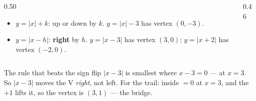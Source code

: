 \documentclass[aspectratio=169, 11pt]{beamer}
\newcommand{\lgrid}[4]{%
  \draw[step=1, linegray!40, very thin] (#1,#3) grid (#2,#4);
  \draw[->, thick, charcoal] (#1,0)--(#2,0) node[below right, font=\tiny]{$x$};
  \draw[->, thick, charcoal] (0,#3)--(0,#4) node[left, font=\tiny]{$y$};}
\begin{document}
\begin{frame}[t, plain]
  \begin{columns}[T]
    \begin{column}{0.50\textwidth}
      \begin{itemize}\setlength{\itemsep}{5pt}
        \item $y=|x|+k$: up or down by $k$. \; $y=|x|-3$ has vertex $(0,-3)$.
        \item $y=|x-h|$: \textbf{right} by $h$. \; $y=|x-3|$ has vertex $(3,0)$; \; $y=|x+2|$ has
              vertex $(-2,0)$.
      \end{itemize}
    \end{column}
    \begin{column}{0.46\textwidth}
      \centering
    \end{column}
  \end{columns}
  \vspace{4pt}
  \begin{block}{The rule that beats the sign flip}
    $|x-3|$ is smallest where $x-3=0$ --- at $x=3$. So $|x-3|$ moves the V \emph{right}, not left.
    For the trail: inside $=0$ at $x=3$, and the $+1$ lifts it, so the vertex is $(3,1)$ --- the bridge.
  \end{block}
\end{frame}
\end{document}
